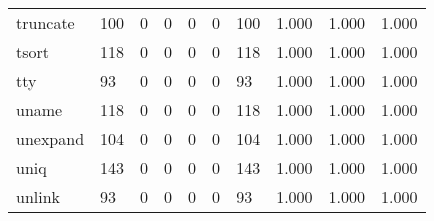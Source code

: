 \begin{longtable}{lp{1.3cm}p{1.3cm}p{1.3cm}p{1.3cm}p{1.3cm}p{1.3cm}p{1.3cm}p{1.3cm}p{1.3cm}}
truncate  &                    100 &                                  0 &                                 0 &                                0 &                                 0 &                             100 &                                1.000 &                                  1.000 &                                1.000 \\
tsort     &                    118 &                                  0 &                                 0 &                                0 &                                 0 &                             118 &                                1.000 &                                  1.000 &                                1.000 \\
tty       &                     93 &                                  0 &                                 0 &                                0 &                                 0 &                              93 &                                1.000 &                                  1.000 &                                1.000 \\
uname     &                    118 &                                  0 &                                 0 &                                0 &                                 0 &                             118 &                                1.000 &                                  1.000 &                                1.000 \\
unexpand  &                    104 &                                  0 &                                 0 &                                0 &                                 0 &                             104 &                                1.000 &                                  1.000 &                                1.000 \\
uniq      &                    143 &                                  0 &                                 0 &                                0 &                                 0 &                             143 &                                1.000 &                                  1.000 &                                1.000 \\
unlink    &                     93 &                                  0 &                                 0 &                                0 &                                 0 &                              93 &                                1.000 &                                  1.000 &                                1.000 \\

\end{longtable}
